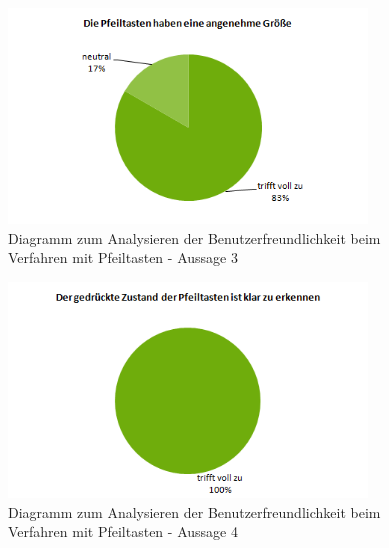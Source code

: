 \begin{figure}[H]
	\centering
		\includegraphics[width=0.85\textwidth]{03_Grafiken/Anhang/UsabilityDiagramme/Aufgabenteil3Aussage3.png}
	\caption[Diagramm zum Analysieren der Benutzerfreundlichkeit beim Verfahren mit Pfeiltasten - Aussage 3]{Diagramm zum Analysieren der Benutzerfreundlichkeit beim Verfahren mit Pfeiltasten - Aussage 3}
	\label{fig:Aufgabenteil3Aussage3}
\end{figure}
\begin{figure}[H]
	\centering
		\includegraphics[width=0.85\textwidth]{03_Grafiken/Anhang/UsabilityDiagramme/Aufgabenteil3Aussage4.png}
	\caption[Diagramm zum Analysieren der Benutzerfreundlichkeit beim Verfahren mit Pfeiltasten - Aussage 4]{Diagramm zum Analysieren der Benutzerfreundlichkeit beim Verfahren mit Pfeiltasten - Aussage 4}
	\label{fig:Aufgabenteil3Aussage4}
\end{figure}
